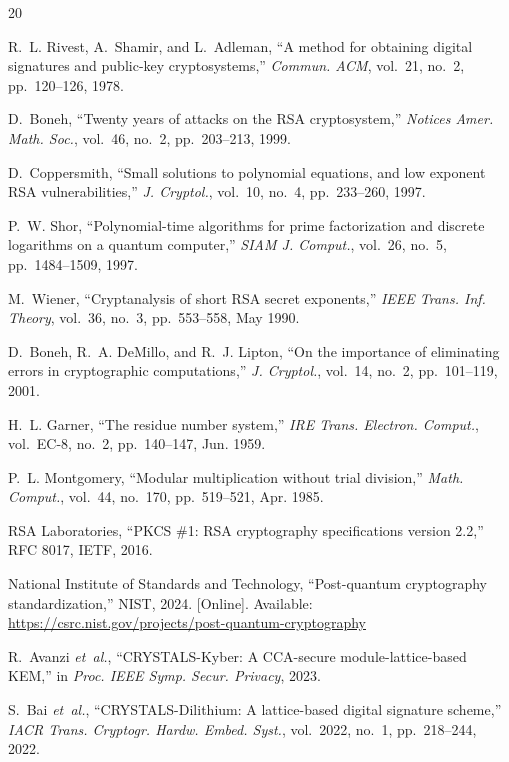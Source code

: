 \documentclass[journal]{IEEEtran}
\begin{document}

\begin{thebibliography}{20}

R.~L. Rivest, A.~Shamir, and L.~Adleman, ``A method for obtaining digital signatures and public-key cryptosystems,'' \textit{Commun. ACM}, vol.~21, no.~2, pp.~120--126, 1978.

D.~Boneh, ``Twenty years of attacks on the RSA cryptosystem,'' \textit{Notices Amer. Math. Soc.}, vol.~46, no.~2, pp.~203--213, 1999.

D.~Coppersmith, ``Small solutions to polynomial equations, and low exponent RSA vulnerabilities,'' \textit{J. Cryptol.}, vol.~10, no.~4, pp.~233--260, 1997.

P.~W. Shor, ``Polynomial-time algorithms for prime factorization and discrete logarithms on a quantum computer,'' \textit{SIAM J. Comput.}, vol.~26, no.~5, pp.~1484--1509, 1997.

M.~Wiener, ``Cryptanalysis of short RSA secret exponents,'' \textit{IEEE Trans. Inf. Theory}, vol.~36, no.~3, pp.~553--558, May 1990.

D.~Boneh, R.~A. DeMillo, and R.~J. Lipton, ``On the importance of eliminating errors in cryptographic computations,'' \textit{J. Cryptol.}, vol.~14, no.~2, pp.~101--119, 2001.

H.~L. Garner, ``The residue number system,'' \textit{IRE Trans. Electron. Comput.}, vol.~EC-8, no.~2, pp.~140--147, Jun. 1959.

P.~L. Montgomery, ``Modular multiplication without trial division,'' \textit{Math. Comput.}, vol.~44, no.~170, pp.~519--521, Apr. 1985.

RSA Laboratories, ``PKCS \#1: RSA cryptography specifications version 2.2,'' RFC 8017, IETF, 2016.

National Institute of Standards and Technology, ``Post-quantum cryptography standardization,'' NIST, 2024. [Online]. Available: \url{https://csrc.nist.gov/projects/post-quantum-cryptography}

R.~Avanzi \textit{et~al.}, ``CRYSTALS-Kyber: A CCA-secure module-lattice-based KEM,'' in \textit{Proc. IEEE Symp. Secur. Privacy}, 2023.

S.~Bai \textit{et~al.}, ``CRYSTALS-Dilithium: A lattice-based digital signature scheme,'' \textit{IACR Trans. Cryptogr. Hardw. Embed. Syst.}, vol.~2022, no.~1, pp.~218--244, 2022.


\end{thebibliography}
\end{document}
